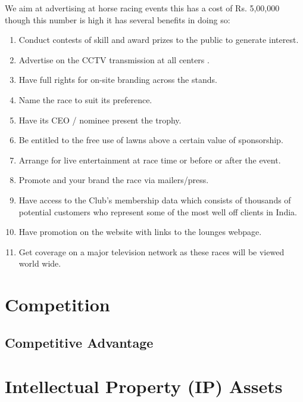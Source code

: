 \documentclass[11pt]{article}
\begin{document}
We aim at advertising at horse racing events this has a cost of Rs. 5,00,000 though this number is high it has several benefits in doing so:
\begin{enumerate}
\item Conduct contests of skill and award prizes to the public to generate interest. 
\item Advertise on the CCTV transmission at all centers .
\item Have full rights for on-site branding across the stands.
\item Name the race to suit its preference.
\item Have its CEO / nominee present the trophy.
\item Be entitled to the free use of lawns above a certain value of sponsorship.
\item Arrange for live entertainment at race time or before or after the event.
\item Promote and your brand the race via mailers/press.
\item Have access to the Club's membership data which consists of thousands of potential customers who represent some of the most well off clients in India.
\item Have promotion on the website with links to the lounges webpage.
\item Get coverage on a major television network as these races will be viewed world wide.
\end{enumerate}


\section{Competition}
  \subsection{Competitive Advantage}



\section{Intellectual Property (IP) Assets}
\end{document}
